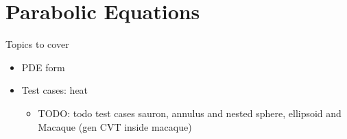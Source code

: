 \chapter{Parabolic Equations}

Topics to cover
\begin{itemize} 
    \item PDE form
    \item Test cases: heat
    \begin{itemize} 
        \item TODO: todo test cases sauron, annulus and nested sphere, ellipsoid and Macaque (gen CVT inside macaque) 
    \end{itemize}
\end{itemize}
